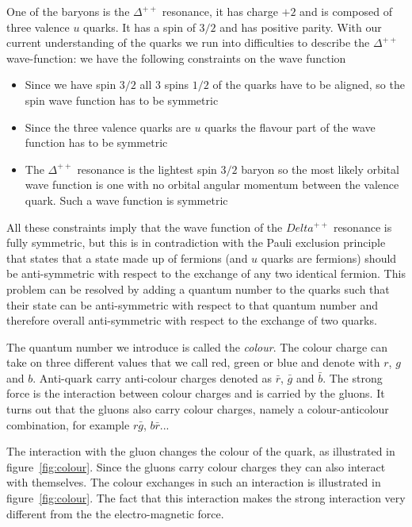 \documentclass[12pt]{article}
\begin{document}
One of the baryons is the $\Delta^{++}$ resonance, it has charge $+2$ and is composed of three valence $u$ quarks. It has a spin of $3/2$ and has positive parity. With our current understanding of the quarks we run into difficulties to describe the $\Delta^{++}$ wave-function: we have the following constraints on the wave function
\begin{itemize}
\item Since we have spin $3/2$ all $3$ spins $1/2$ of the quarks have to be aligned, so the spin wave function has to be symmetric
\item Since the three valence quarks are $u$ quarks the flavour part of the wave function has to be symmetric
\item The $\Delta^{++}$ resonance is the lightest spin $3/2$ baryon so the most likely orbital wave function is one with no orbital angular momentum between the valence quark. Such a wave function is symmetric   
\end{itemize} 
All these constraints imply that the wave function of the $Delta^{++}$ resonance is fully symmetric, but this is in contradiction with the Pauli exclusion principle that states that a state made up of fermions (and $u$ quarks are fermions) should be anti-symmetric with respect to the exchange of any two identical fermion. This problem can be resolved by adding a quantum number to the quarks such that their state can be anti-symmetric with respect to that quantum number and therefore overall anti-symmetric with respect to the exchange of two quarks. 


The quantum number we introduce is called the \emph{colour}. The colour charge can take on three different values that we call red, green or blue and denote with $r$, $g$ and $b$. Anti-quark carry anti-colour charges denoted as $\bar r$, $\bar g$ and $\bar b$. The strong force is the interaction between colour charges and is carried by the gluons. It turns out that the gluons also carry colour charges, namely a colour-anticolour combination, for example $r\bar g$, $b\bar r$...    

The interaction with the gluon changes the colour of the quark, as illustrated in figure~\ref{fig:colour}. Since the gluons carry colour charges they can also interact with themselves. The colour exchanges in such an interaction is illustrated in figure~\ref{fig:colour}. The fact that this interaction makes the strong interaction very different from the the electro-magnetic force. 
\end{document}
